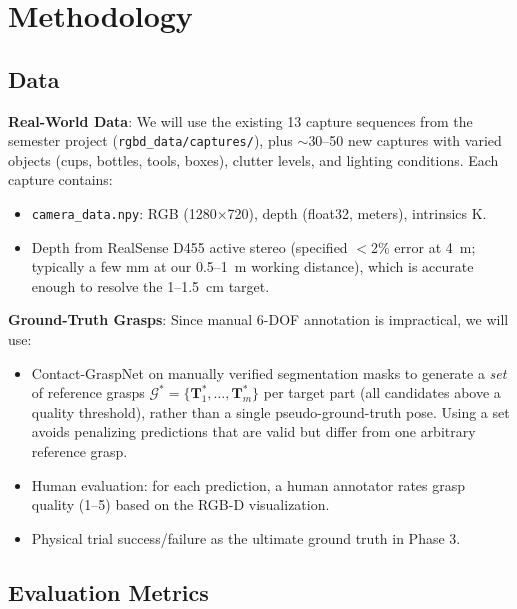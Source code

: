 \documentclass[11pt,a4paper]{article}
\begin{document}
\section{Methodology}

\subsection{Data}
\label{sec:data}

\textbf{Real-World Data}: We will use the existing 13 capture sequences from the semester project (\texttt{rgbd\_data/captures/}), plus $\sim$30--50 new captures with varied objects (cups, bottles, tools, boxes), clutter levels, and lighting conditions. Each capture contains:
\begin{itemize}[nosep]
    \item \texttt{camera\_data.npy}: RGB (1280$\times$720), depth (float32, meters), intrinsics K.
    \item Depth from RealSense D455 active stereo (specified $<$2\% error at 4~m; typically a few mm at our 0.5--1~m working distance), which is accurate enough to resolve the 1--1.5~cm target.
\end{itemize}

\textbf{Ground-Truth Grasps}: Since manual 6-DOF annotation is impractical, we will use:
\begin{itemize}[nosep]
    \item Contact-GraspNet on manually verified segmentation masks to generate a \emph{set} of reference grasps $\mathcal{G}^* = \{\mathbf{T}^*_1, \ldots, \mathbf{T}^*_m\}$ per target part (all candidates above a quality threshold), rather than a single pseudo-ground-truth pose. Using a set avoids penalizing predictions that are valid but differ from one arbitrary reference grasp.
    \item Human evaluation: for each prediction, a human annotator rates grasp quality (1--5) based on the RGB-D visualization.
    \item Physical trial success/failure as the ultimate ground truth in Phase 3.
\end{itemize}

\subsection{Evaluation Metrics}
\end{document}
